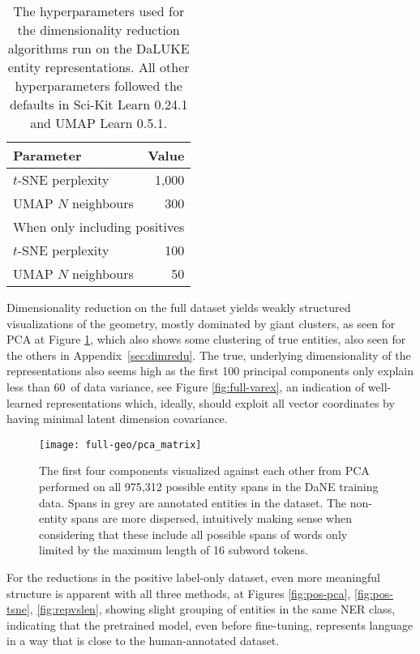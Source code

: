 \documentclass[main.tex]{subfiles}
\begin{document}
\begin{table}[H]
    \centering
    \begin{tabular}{l|r}
        Parameter           &  Value\\\hline
        $t$-SNE perplexity  &  1,000   \\
        UMAP $N$ neighbours &  300\\\hline
        \multicolumn{2}{c}{When only including positives}\\\hline
        $t$-SNE perplexity  & 100\\
        UMAP $N$ neighbours & 50
    \end{tabular}
    \caption{
        The hyperparameters used for the dimensionality reduction algorithms run on the DaLUKE entity representations.
        All other hyperparameters followed the defaults in Sci-Kit Learn 0.24.1 and UMAP Learn 0.5.1.
    }\label{tab:dimreducer-hyper}
\end{table}\noindent
Dimensionality reduction on the full dataset yields weakly structured visualizations of the geometry, mostly dominated by giant clusters, as seen for PCA at Figure \ref{fig:all-pca}, which also shows some clustering of true entities, also seen for the others in Appendix~\ref{sec:dimredu}.
The true, underlying dimensionality of the representations also seems high as the first 100 principal components only explain less than 60\pro\ of data variance, see Figure \ref{fig:full-varex}, an indication of well-learned representations which, ideally, should exploit all vector coordinates by having minimal latent dimension covariance.

\begin{figure}[H]
    \centering
        \texttt{[image: full-geo/pca\_matrix]}
    \caption{
        The first four components visualized against each other from PCA performed on all 975,312 possible entity spans in the DaNE training data.
        Spans in grey are annotated entities in the dataset.
        The non-entity spans are more dispersed, intuitively making sense when considering that these include all possible spans of words only limited by the maximum length of 16 subword tokens.
    }
    \label{fig:all-pca}
\end{figure}\noindent
For the reductions in the positive label-only dataset, even more meaningful structure is apparent with all three methods, at Figures \ref{fig:pos-pca}, \ref{fig:pos-tsne}, \ref{fig:repvslen}, showing slight grouping of entities in the same NER class, indicating that the pretrained model, even before fine-tuning, represents language in a way that is close to the human-annotated dataset.
\end{document}
